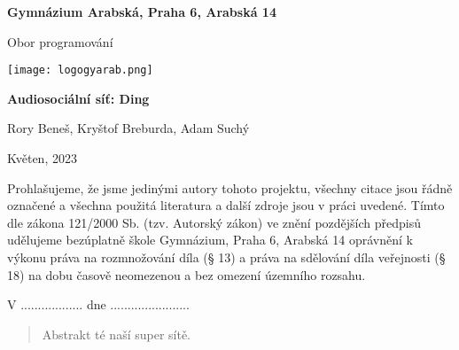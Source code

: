 
\begin{titlepage}
\begin{center}
\large \vspace*{\fill}
\thispagestyle{empty}

\LARGE

{ \huge \textbf{Gymnázium Arabská, Praha 6, Arabská 14}}

{\LARGE Obor programování }

\vfill
\texttt{[image: logogyarab.png]}
\vspace{15pt}

\vfill

{\huge \textbf{Audiosociální síť: Ding}}

\vfill

Rory Beneš, Kryštof Breburda, Adam Suchý

\vfill

{\large Květen, 2023}

\vspace*{\fill}
\end{center}
\end{titlepage}

\thispagestyle{empty}
\addtocounter{page}{-1}
\vspace*{\fill}
Prohlašujeme, že jsme jedinými autory tohoto projektu, všechny citace jsou řádně označené a všechna 
použitá literatura a další zdroje jsou v práci uvedené. Tímto dle zákona 121/2000 Sb. (tzv. Autorský zákon) 
ve znění pozdějších předpisů udělujeme bezúplatně škole Gymnázium, Praha 6, Arabská 14 oprávnění k výkonu 
práva na rozmnožování díla (§ 13) a práva na sdělování díla veřejnosti (§ 18) na dobu časově neomezenou a 
bez omezení územního rozsahu.

\vspace{2cm}
V .................. dne .......................


\vspace{2cm}


\vspace{2cm}


\vspace{2cm}

\newpage
\begin{abstract}
	Abstrakt té naší super sítě.
\end{abstract}

\tableofcontents
